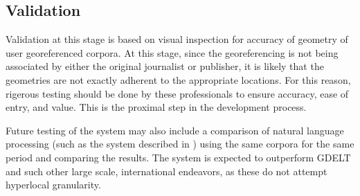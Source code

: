 %

\subsection{Validation}
Validation at this stage is based on visual inspection for accuracy of geometry of user georeferenced corpora. At this stage, since the georeferencing is not being associated by either the original journalist or publisher, it is likely that the geometries are not exactly adherent to the appropriate locations. For this reason, rigerous testing should be done by these professionals to ensure accuracy, ease of entry, and value. This is the proximal step in the development process.

Future testing of the system may also include a comparison of natural language processing (such as the system described in \cite{Rivera2020}) using the same corpora for the same period and comparing the results. The system is expected to outperform GDELT and such other large scale, international endeavors, as these do not attempt hyperlocal granularity.


